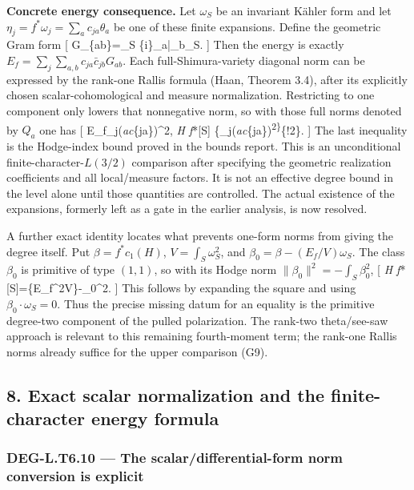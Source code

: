 \documentclass[11pt,a4paper]{article}
\theoremstyle{definition}
\begin{document}
\textbf{Concrete energy consequence.} Let \(\omega_S\) be an invariant
Kähler form and let \(\eta_j=f^*\omega_j=\sum_a c_{ja}\theta_a\) be one
of these finite expansions. Define the geometric Gram form {[}
G\_\{ab\}=\int\_S
\{i\}\theta\_a\wedge\bar\theta\_b\wedge\omega\_S. {]} Then the
energy is exactly \(E_f=\sum_j\sum_{a,b}c_{ja}\bar c_{jb}G_{ab}\). Each
full-Shimura-variety diagonal norm can be expressed by the rank-one
Rallis formula (Haan, Theorem 3.4), after its explicitly chosen
scalar-cohomological and measure normalization. Restricting to one
component only lowers that nonnegative norm, so with those full norms
denoted by \(Q_a\) one has {[}
E\_f\le\sum\_j\left(\sum\emph{a\textbar c}\{ja\}\textbar{}\right)\^{}2,
\qquad \deg\emph{H f}*{[}S{]}
\left\{\sum\_j\left(\sum\emph{a\textbar c}\{ja\}\textbar{}\right)\textsuperscript{2\right\}}\{!2\}.
 {]} The last inequality is the Hodge-index bound proved in the
bounds report. This is an unconditional finite-character-\(L(3/2)\)
comparison after specifying the geometric realization coefficients and
all local/measure factors. It is not an effective degree bound in the
level alone until those quantities are controlled. The actual existence
of the expansions, formerly left as a gate in the earlier analysis, is
now resolved.

A further exact identity locates what prevents one-form norms from
giving the degree itself. Put \(\beta=f^*c_1(H)\),
\(V=\int_S\omega_S^2\), and \(\beta_0=\beta-(E_f/V)\omega_S\). The class
\(\beta_0\) is primitive of type \((1,1)\), so with its Hodge norm
\(\|\beta_0\|^2=-\int_S\beta_0^2\), {[} \deg\emph{H
f}*{[}S{]}=\{E\_f\^{}2\over V\}-\textbar{}\beta\_0\textbar\^{}2.
 {]} This follows by expanding the square and using
\(\beta_0\cdot\omega_S=0\). Thus the precise missing datum for an
equality is the primitive degree-two component of the pulled
polarization. The rank-two theta/see-saw approach is relevant to this
remaining fourth-moment term; the rank-one Rallis norms already suffice
for the upper comparison (G9).

\subsection{8. Exact scalar normalization and the finite-character
energy
formula}\label{exact-scalar-normalization-and-the-finite-character-energy-formula}

\subsubsection{DEG-L.T6.10 --- The scalar/differential-form norm
conversion is
explicit}\label{deg-l.t6.10-the-scalardifferential-form-norm-conversion-is-explicit}
\end{document}
